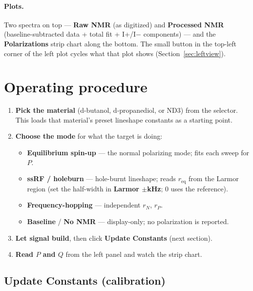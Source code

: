 \documentclass[11pt]{article}
\begin{document}
\paragraph{Plots.} Two spectra on top --- \textbf{Raw NMR} (as digitized) and
\textbf{Processed NMR} (baseline-subtracted data + total fit + I+/I$-$ components) --- and the
\textbf{Polarizations} strip chart along the bottom. The small button in the top-left corner of
the left plot cycles what that plot shows (Section~\ref{sec:leftview}).

\section{Operating procedure}

\begin{enumerate}[nosep]
  \item \textbf{Pick the material} (d-butanol, d-propanediol, or ND3) from the selector. This
        loads that material's preset lineshape constants as a starting point.
  \item \textbf{Choose the mode} for what the target is doing:
    \begin{itemize}[nosep]
      \item \textbf{Equilibrium spin-up} --- the normal polarizing mode; fits each sweep for $P$.
      \item \textbf{ssRF / holeburn} --- hole-burnt lineshape; reads $r_{\text{eq}}$ from the
            Larmor region (set the half-width in \textbf{Larmor $\pm$kHz}; 0 uses the reference).
      \item \textbf{Frequency-hopping} --- independent $r_N$, $r_P$.
      \item \textbf{Baseline} / \textbf{No NMR} --- display-only; no polarization is reported.
    \end{itemize}
  \item \textbf{Let signal build}, then click \textbf{Update Constants} (next section).
  \item \textbf{Read $P$ and $Q$} from the left panel and watch the strip chart.
\end{enumerate}

\subsection{Update Constants (calibration)}
\end{document}

